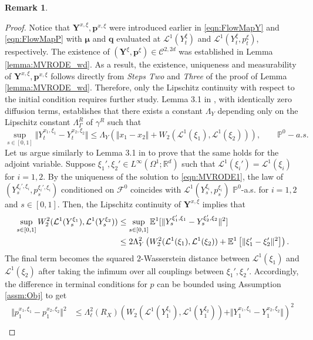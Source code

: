 \documentclass{article}
\newtheorem{remark}[theorem]{Remark}
\newcommand{\R}{\mathbb{R}}
\newcommand{\E}{\mathbb{E}}
\begin{document}
\begin{appendices}
\begin{remark}
\end{remark}
\begin{proof}
Notice that $\bm Y^{x,\xi},\bm p^{x,\xi}$ were introduced earlier in \eqref{eqn:FlowMapY} and \eqref{eqn:FlowMapP} with $\bm \mu$ and $\bm q$ evaluated at $\mathcal L^1(Y^\xi_t)$ and $\mathcal L^1(Y^\xi_t,p^{\xi}_t)$, respectively. The existence of $(\bm Y^\xi,\bm p^\xi)\in\mathscr{C}^{2,2d}$ was established in Lemma \ref{lemma:MVRODE_wd}. As a result, the existence, uniqueness and measurability of $\bm Y^{x,\xi},\bm p^{x,\xi}$ follows directly from \textit{Steps Two} and \textit{Three} of the proof of Lemma \ref{lemma:MVRODE_wd}. Therefore, only the Lipschitz continuity with respect to the initial condition requires further study. Lemma 3.1 in \cite{peng}, with identically zero diffusion terms, establishes that there exists a constant $\Lambda_Y$ depending only on the Lipschitz constant $\Lambda_\Gamma^R$ of $\gamma^R$ such that
\[
\sup_{s\in[0,1]}\Vert Y^{x_1,\xi_1}_t-Y^{x_2,\xi_2}_t\Vert \le \Lambda_Y\left(\Vert x_1-x_2\Vert+W_2(\mathcal L^1(\xi_1),\mathcal L^1(\xi_2)) \right),\qquad \mathbb P^0-a.s.
\]
Let us argue similarly to Lemma 3.1 in \cite{peng} to prove that the same holds for the adjoint variable. Suppose $\xi_1',\xi_2'\in L^\infty(\Omega^1;\R^d)$ such that $\mathcal L^1(\xi_i')=\mathcal L^1(\xi_i)$ for $i=1,2$. 
By the uniqueness of the solution to \eqref{eqn:MVRODE1}, the law of $(Y^{\xi_i',\xi_i}_s,p^{\xi_i',\xi_i}_s)$ conditioned on $\mathcal F^0$ coincides with $\mathcal L^1( Y^{\xi_i}_s,p^{\xi_i}_s)$ $\mathbb P^0$-a.s. for $i=1,2$ and $s\in[0,1]$. Then, the Lipschitz continuity of $\bm Y^{x,\xi}$ implies that 
\begin{align}\label{eqn:EYxixi}
    \sup_{s\in[0,1]} W^2_2(\mathcal L^1(Y^{\xi_1}_s),\mathcal L^1(Y^{\xi_2}_s))&\le \sup_{s\in[0,1]}\E^1[ \Vert Y^{\xi_1',\xi_1}_s-Y^{\xi_2',\xi_2}_s\Vert^2]\\& \le 2\Lambda_Y^2\left( W_2^2(\mathcal L^1(\xi_1),\mathcal L^1(\xi_2)) + \E^1\left[ \Vert \xi_1'-\xi_2'\Vert^2\right]\right).\notag
\end{align}
The final term becomes the squared $2$-Wasserstein distance between $\mathcal L^1(\xi_1)$ and $\mathcal L^1(\xi_2)$ after taking the infimum over all couplings between $\xi_1',\xi_2'$.
Accordingly, the difference in terminal conditions for $p$ can be bounded using Assumption \ref{assm:Obj} to get
\begin{align*}
    \Vert p^{x_1,\xi_1}_1-p_1^{x_2,\xi_2}\Vert^2 &\le \Lambda^2_\ell(R_X)\left( W_2(\mathcal L^1(Y^{\xi_1}_1), \mathcal L^1(Y^{\xi_2}_1))+\Vert Y^{x_1,\xi_1}_1-Y^{x_2,\xi_2}_1\Vert\right)^2\\

\end{align*}
\end{proof}
\end{appendices}
\end{document}
